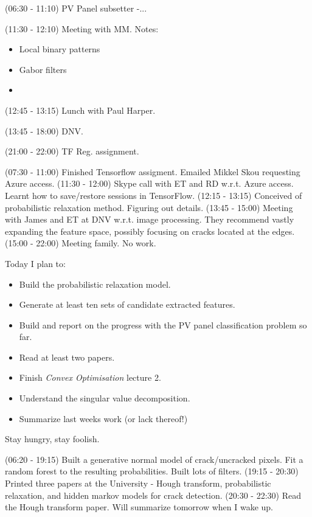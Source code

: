 \documentclass[idxtotoc,hyperref,openany]{labbook} %
\begin{document}
(06:30 - 11:10) PV Panel subsetter -...

(11:30 - 12:10) Meeting with MM. Notes:
\begin{itemize}
	\item Local binary patterns
	\item Gabor filters
	\item 
\end{itemize}

(12:45 - 13:15) Lunch with Paul Harper.

(13:45 - 18:00) DNV.

(21:00 - 22:00) TF Reg. assignment.


(07:30 - 11:00) Finished Tensorflow assigment. Emailed Mikkel Skou requesting Azure access.
(11:30 - 12:00) Skype call with ET and RD w.r.t. Azure access. Learnt how to save/restore sessions in TensorFlow.
(12:15 - 13:15) Conceived of probabilistic relaxation method. Figuring out details.
(13:45 - 15:00) Meeting with James and ET at DNV w.r.t. image processing. They recommend vastly expanding the feature space, possibly focusing on cracks located at the edges.
(15:00 - 22:00) Meeting family. No work.



Today I plan to:
\begin{itemize}
	\item Build the probabilistic relaxation model.
	\item Generate at least ten sets of candidate extracted features.
	\item Build and report on the progress with the PV panel classification problem so far.
	\item Read at least two papers.
	\item Finish \emph{Convex Optimisation} lecture 2.
	\item Understand the singular value decomposition.
	\item Summarize last weeks work (or lack thereof!)
\end{itemize}
Stay hungry, stay foolish.

(06:20 - 19:15) Built a generative normal model of crack/uncracked pixels. Fit a random forest to the resulting probabilities. Built lots of filters.
(19:15 - 20:30) Printed three papers at the University - Hough transform, probabilistic relaxation, and hidden markov models for crack detection.
(20:30 - 22:30) Read the Hough transform paper. Will summarize tomorrow when I wake up.
\end{document}
